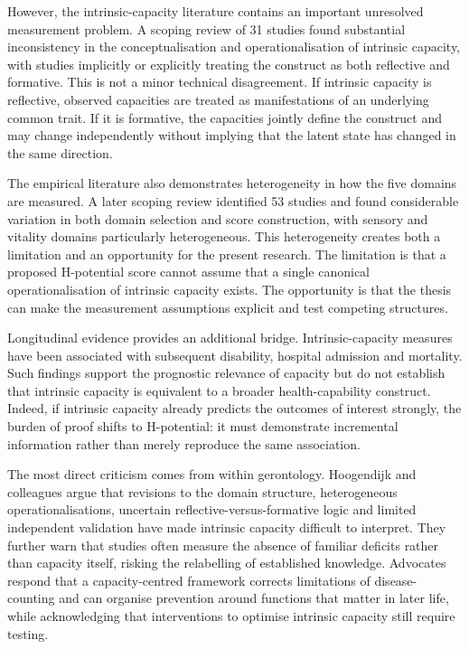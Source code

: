 However, the intrinsic-capacity literature contains an important unresolved measurement problem. A scoping review of 31 studies found substantial inconsistency in the conceptualisation and operationalisation of intrinsic capacity, with studies implicitly or explicitly treating the construct as both reflective and formative. \cite{who_intrinsic_capacity_2017,beard_intrinsic_2019} This is not a minor technical disagreement. If intrinsic capacity is reflective, observed capacities are treated as manifestations of an underlying common trait. If it is formative, the capacities jointly define the construct and may change independently without implying that the latent state has changed in the same direction.

The empirical literature also demonstrates heterogeneity in how the five domains are measured. A later scoping review identified 53 studies and found considerable variation in both domain selection and score construction, with sensory and vitality domains particularly heterogeneous. \cite{intrinsic_capacity_predictive_2023} This heterogeneity creates both a limitation and an opportunity for the present research. The limitation is that a proposed H-potential score cannot assume that a single canonical operationalisation of intrinsic capacity exists. The opportunity is that the thesis can make the measurement assumptions explicit and test competing structures.

Longitudinal evidence provides an additional bridge. Intrinsic-capacity measures have been associated with subsequent disability, hospital admission and mortality. \cite{beard_intrinsic_2019,intrinsic_capacity_predictive_2023} Such findings support the prognostic relevance of capacity but do not establish that intrinsic capacity is equivalent to a broader health-capability construct. Indeed, if intrinsic capacity already predicts the outcomes of interest strongly, the burden of proof shifts to H-potential: it must demonstrate incremental information rather than merely reproduce the same association.

The most direct criticism comes from within gerontology. Hoogendijk and
colleagues argue that revisions to the domain structure, heterogeneous
operationalisations, uncertain reflective-versus-formative logic and limited
independent validation have made intrinsic capacity difficult to interpret.
They further warn that studies often measure the absence of familiar deficits
rather than capacity itself, risking the relabelling of established knowledge.
\cite{hoogendijk_2023} Advocates respond that a capacity-centred framework
corrects limitations of disease-counting and can organise prevention around
functions that matter in later life, while acknowledging that interventions to
optimise intrinsic capacity still require testing. \cite{geerinck_2022}

